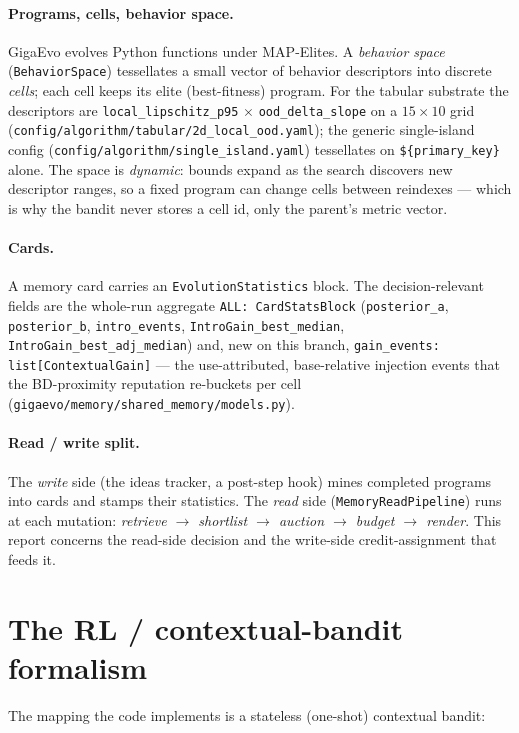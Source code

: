 \documentclass[11pt]{article}
\newcommand{\code}[1]{\texttt{#1}}
\begin{document}
\paragraph{Programs, cells, behavior space.} GigaEvo evolves Python functions
under MAP-Elites. A \emph{behavior space} (\code{BehaviorSpace}) tessellates a
small vector of behavior descriptors into discrete \emph{cells}; each cell keeps
its elite (best-fitness) program. For the tabular substrate the descriptors are
\code{local\_lipschitz\_p95} $\times$ \code{ood\_delta\_slope} on a $15\times10$
grid (\code{config/algorithm/tabular/2d\_local\_ood.yaml}); the generic
single-island config (\code{config/algorithm/single\_island.yaml}) tessellates
on \code{\$\{primary\_key\}} alone. The space is \emph{dynamic}: bounds expand as
the search discovers new descriptor ranges, so a fixed program can change cells
between reindexes --- which is why the bandit never stores a cell id, only the
parent's metric vector.

\paragraph{Cards.} A memory card carries an \code{EvolutionStatistics} block.
The decision-relevant fields are the whole-run aggregate
\code{ALL: CardStatsBlock} (\code{posterior\_a}, \code{posterior\_b},
\code{intro\_events}, \code{IntroGain\_best\_median},
\code{IntroGain\_best\_adj\_median}) and, new on this branch,
\code{gain\_events: list[ContextualGain]} --- the use-attributed, base-relative
injection events that the BD-proximity reputation re-buckets per cell
(\code{gigaevo/memory/shared\_memory/models.py}).

\paragraph{Read / write split.} The \emph{write} side (the ideas tracker, a
post-step hook) mines completed programs into cards and stamps their statistics.
The \emph{read} side (\code{MemoryReadPipeline}) runs at each mutation:
\emph{retrieve $\to$ shortlist $\to$ auction $\to$ budget $\to$ render}. This
report concerns the read-side decision and the write-side credit-assignment that
feeds it.

\section{The RL / contextual-bandit formalism}

The mapping the code implements is a stateless (one-shot) contextual bandit:
\end{document}
